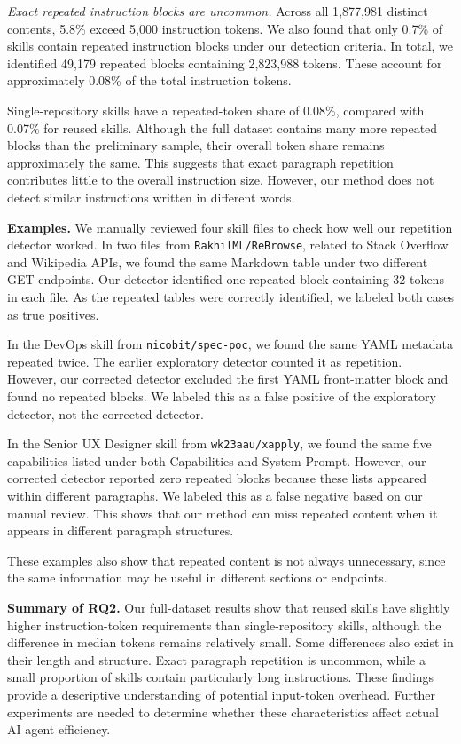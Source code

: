 \documentclass[sigconf,review]{acmart}
\begin{document}
\emph{Exact repeated instruction blocks are uncommon.}
Across all 1{,}877{,}981 distinct contents, 5.8\% exceed 5,000
instruction tokens. We also found that only 0.7\% of skills
contain repeated instruction blocks under our detection
criteria. In total, we identified 49{,}179 repeated blocks
containing 2{,}823{,}988 tokens. These account for approximately
0.08\% of the total instruction tokens.

Single-repository skills have a repeated-token share of
0.08\%, compared with 0.07\% for reused skills. Although
the full dataset contains many more repeated blocks than
the preliminary sample, their overall token share remains
approximately the same. This suggests that exact paragraph
repetition contributes little to the overall instruction size.
However, our method does not detect similar instructions
written in different words.


\textbf{Examples.}
We manually reviewed four skill files to check how well our
repetition detector worked. In two files from
\texttt{RakhilML/ReBrowse}, related to Stack Overflow and
Wikipedia APIs, we found the same Markdown table under two
different GET endpoints. Our detector identified one repeated
block containing 32 tokens in each file. As the repeated tables
were correctly identified, we labeled both cases as true
positives.

In the DevOps skill from \texttt{nicobit/spec-poc}, we found
the same YAML metadata repeated twice. The earlier exploratory
detector counted it as repetition. However, our corrected
detector excluded the first YAML front-matter block and found
no repeated blocks. We labeled this as a false positive of
the exploratory detector, not the corrected detector.

In the Senior UX Designer skill from \texttt{wk23aau/xapply},
we found the same five capabilities listed under both
Capabilities and System Prompt. However, our corrected detector
reported zero repeated blocks because these lists appeared
within different paragraphs. We labeled this as a false
negative based on our manual review. This shows that our method
can miss repeated content when it appears in different paragraph
structures.

These examples also show that repeated content is not always
unnecessary, since the same information may be useful in
different sections or endpoints.


\textbf{Summary of RQ2.}
Our full-dataset results show that reused skills have slightly
higher instruction-token requirements than single-repository
skills, although the difference in median tokens remains
relatively small. Some differences also exist in their length
and structure. Exact paragraph repetition is uncommon, while
a small proportion of skills contain particularly long
instructions. These findings provide a descriptive
understanding of potential input-token overhead.
Further experiments are needed to determine whether these
characteristics affect actual AI agent efficiency.
\end{document}
